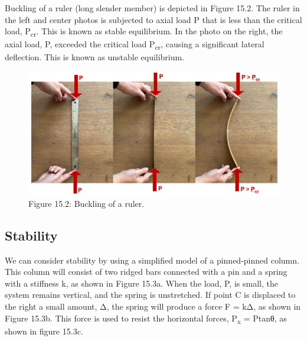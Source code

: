 \documentclass[
  letterpaper,
  DIV=11,
  numbers=noendperiod]{scrreprt}
\theoremstyle{definition}
\theoremstyle{remark}
\begin{document}
Buckling of a ruler (long slender member) is depicted in Figure 15.2.
The ruler in the left and center photos is subjected to axial load P
that is less than the critical load, P\textsubscript{cr}. This is known
as stable equilibrium. In the photo on the right, the axial load, P,
exceeded the critical load P\textsubscript{cr}, causing a significant
lateral deflection. This is known as unstable equilibrium.

\begin{figure}[H]

{\centering \includegraphics{images/CH15s PNGs/figure 15.2.png}

}

\caption{Figure 15.2: Buckling of a ruler.}

\end{figure}%

\subsection{Stability}\label{stability}

We can consider stability by using a simplified model of a pinned-pinned
column. This column will consist of two ridged bars connected with a pin
and a spring with a stiffness k, as shown in Figure 15.3a. When the
load, P, is small, the system remains vertical, and the spring is
unstretched. If point C is displaced to the right a small amount, Δ, the
spring will produce a force F = kΔ, as shown in Figure 15.3b. This force
is used to resist the horizontal forces, P\textsubscript{x} = Ptanθ, as
shown in figure 15.3c.
\end{document}
